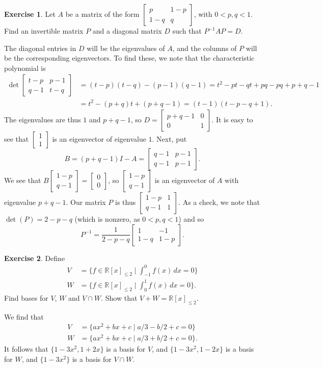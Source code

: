 \documentclass{amsart}
\newcommand{\R}         {{\mathbb{R}}}
\newcommand{\bsm}       {\left[\begin{smallmatrix}}
\newcommand{\esm}       {\end{smallmatrix}\right]}
\newcommand{\bpm}       {\left[\begin{matrix}}
\newcommand{\epm}       {\end{matrix}\right]}
\newcommand{\st}        {\;|\;}
\renewcommand{\:}{\colon}
\theoremstyle{definition}
\newtheorem{exercise}{Exercise}
\newenvironment{solution}{{\noindent \bf Solution:}}{}
\begin{document}
\begin{exercise}
 Let $A$ be a matrix of the form
 $\bpm p & 1-p \\ 1-q & q\epm$, with $0<p,q<1$.  Find an
 invertible matrix $P$ and a diagonal matrix $D$ such that
 $P^{-1}AP=D$.  
\end{exercise}
\begin{solution}
 The diagonal entries in $D$ will be the eigenvalues of $A$,
 and the columns of $P$ will be the corresponding
 eigenvectors.  To find these, we note that the
 characteristic polynomial is
 \begin{align*}
  \det\bpm t-p & p-1 \\ q-1 & t-q \epm 
   &= (t-p)(t-q) - (p-1)(q-1) 
    = t^2 - pt - qt + pq - pq + p + q - 1 \\
   &= t^2-(p+q)t+(p+q-1) 
    = (t-1)(t-p-q+1).
 \end{align*}
 The eigenvalues are thus $1$ and $p+q-1$, so
 $D=\bpm p+q-1&0\\0&1\epm$.  It is easy to see that
 $\bsm 1\\1\esm$ is an eigenvector of eigenvalue $1$.  Next,
 put 
 \[ B = (p+q-1)I - A = \bpm q-1 & p-1 \\ q-1 & p-1 \epm. \]
 We see that $B\bsm 1-p\\ q-1\esm=\bsm 0\\ 0\esm$, so
 $\bsm 1-p\\ q-1\esm$ is an eigenvector of $A$ with
 eigenvalue $p+q-1$.  Our matrix $P$ is thus
 $\bpm 1-p&1\\q-1&1\epm$.  As a check, we note that 
 $\det(P)=2-p-q$ (which is nonzero, as $0<p,q<1$) and so 
 \[ P^{-1} = \frac{1}{2-p-q}\bpm 1 & -1 \\ 1-q & 1-p \epm. \]
\end{solution}

\begin{exercise}
 Define
 \begin{align*}
  V &= \{f\in\R[x]_{\leq 2} \st \int_{-1}^0 f(x)\,dx=0\} \\
  W &= \{f\in\R[x]_{\leq 2} \st \int_0^1    f(x)\,dx=0\}.
 \end{align*}
 Find bases for $V$, $W$ and $V\cap W$.  Show that
 $V+W=\R[x]_{\leq 2}$.
\end{exercise}
\begin{solution}
 We find that 
 \begin{align*}
  V &= \{ax^2+bx+c\st a/3-b/2+c=0\} \\
  W &= \{ax^2+bx+c\st a/3+b/2+c=0\}.
 \end{align*}
 It follows that $\{1-3x^2,1+2x\}$ is a basis for $V$, and
 $\{1-3x^2,1-2x\}$ is a basis for $W$, and $\{1-3x^2\}$ is a
 basis for $V\cap W$.
\end{solution}
\end{document}
